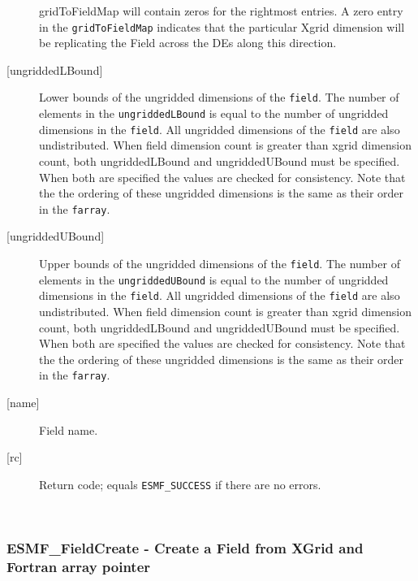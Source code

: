 \begin{description}
   gridToFieldMap will contain zeros for the rightmost entries. A zero 
   entry in the {\tt gridToFieldMap} indicates that the particular 
   Xgrid dimension will be replicating the Field across the DEs along 
   this direction. 
   \item [{[ungriddedLBound]}] 
   Lower bounds of the ungridded dimensions of the {\tt field}. 
   The number of elements in the {\tt ungriddedLBound} is equal to the number of ungridded 
   dimensions in the {\tt field}. All ungridded dimensions of the 
   {\tt field} are also undistributed. When field dimension count is 
   greater than xgrid dimension count, both ungriddedLBound and ungriddedUBound 
   must be specified. When both are specified the values are checked 
   for consistency. Note that the the ordering of 
   these ungridded dimensions is the same as their order in the {\tt farray}. 
   \item [{[ungriddedUBound]}] 
   Upper bounds of the ungridded dimensions of the {\tt field}. 
   The number of elements in the {\tt ungriddedUBound} is equal to the number of ungridded 
   dimensions in the {\tt field}. All ungridded dimensions of the 
   {\tt field} are also undistributed. When field dimension count is 
   greater than xgrid dimension count, both ungriddedLBound and ungriddedUBound 
   must be specified. When both are specified the values are checked 
   for consistency. Note that the the ordering of 
   these ungridded dimensions is the same as their order in the {\tt farray}. 
   \item [{[name]}] 
   Field name. 
   \item [{[rc]}] 
   Return code; equals {\tt ESMF\_SUCCESS} if there are no errors. 
   \end{description} 
    
 
\mbox{}\hrulefill\ 
 
\subsubsection [ESMF\_FieldCreate] {ESMF\_FieldCreate - Create a Field from XGrid and Fortran array pointer }


